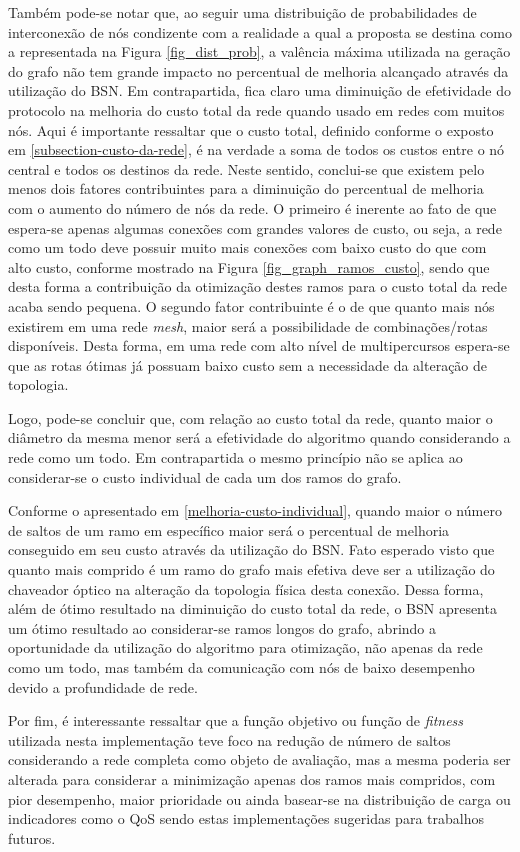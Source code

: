 Também pode-se notar que, ao seguir uma distribuição de probabilidades de interconexão de nós condizente com a realidade a qual a proposta se destina como a representada na Figura \ref{fig_dist_prob}, a valência máxima utilizada na geração do grafo não tem grande impacto no percentual de melhoria alcançado através da utilização do BSN. Em contrapartida, fica claro uma diminuição de efetividade do protocolo na melhoria do custo total da rede quando usado em redes com muitos nós. Aqui é importante ressaltar que o custo total, definido conforme o exposto em \ref{subsection-custo-da-rede}, é na verdade a soma de todos os custos entre o nó central e todos os destinos da rede. Neste sentido, conclui-se que existem pelo menos dois fatores contribuintes para a diminuição do percentual de melhoria com o aumento do número de nós da rede. O primeiro é inerente ao fato de que espera-se apenas algumas conexões com grandes valores de custo, ou seja, a rede como um todo deve possuir muito mais conexões com baixo custo do que com alto custo, conforme mostrado na Figura \ref{fig_graph_ramos_custo}, sendo que desta forma a contribuição da otimização destes ramos para o custo total da rede acaba sendo pequena. O segundo fator contribuinte é o de que quanto mais nós existirem em uma rede \emph{mesh}, maior será a possibilidade de combinações/rotas disponíveis. Desta forma, em uma rede com alto nível de multipercursos espera-se que as rotas ótimas já possuam baixo custo sem a necessidade da alteração de topologia.

Logo, pode-se concluir que, com relação ao custo total da rede, quanto maior o diâmetro da mesma menor será a efetividade do algoritmo quando considerando a rede como um todo. Em contrapartida o mesmo princípio não se aplica ao considerar-se o custo individual de cada um dos ramos do grafo.

Conforme o apresentado em \ref{melhoria-custo-individual}, quando maior o número de saltos de um ramo em específico maior será o percentual de melhoria conseguido em seu custo através da utilização do BSN. Fato esperado visto que quanto mais comprido é um ramo do grafo mais efetiva deve ser a utilização do chaveador óptico na alteração da topologia física desta conexão. Dessa forma, além de ótimo resultado na diminuição do custo total da rede, o BSN apresenta um ótimo resultado ao considerar-se ramos longos do grafo, abrindo a oportunidade da utilização do algoritmo para otimização, não apenas da rede como um todo, mas também da comunicação com nós de baixo desempenho devido a profundidade de rede.

Por fim, é interessante ressaltar que a função objetivo ou função de \emph{fitness} utilizada nesta implementação teve foco na redução de número de saltos considerando a rede completa como objeto de avaliação, mas a mesma poderia ser alterada para considerar a minimização apenas dos ramos mais compridos, com pior desempenho, maior prioridade ou ainda basear-se na distribuição de carga ou indicadores como o QoS sendo estas implementações sugeridas para trabalhos futuros.


